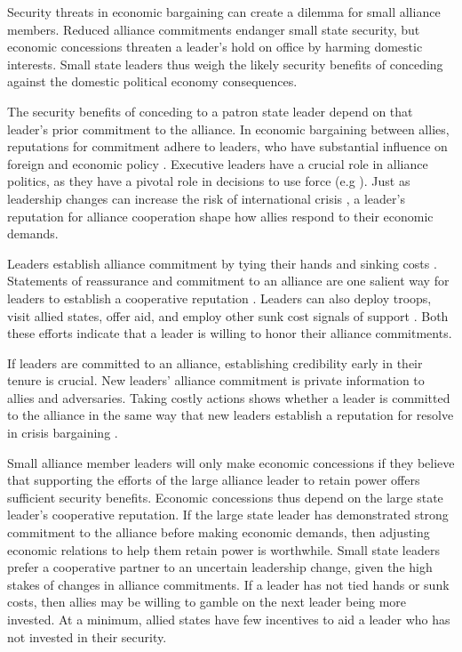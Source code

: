 \documentclass[12pt]{article}
\begin{document}
Security threats in economic bargaining can create a dilemma for small alliance members. 
Reduced alliance commitments endanger small state security, but economic concessions threaten a leader's hold on office by harming domestic interests. 
Small state leaders thus weigh the likely security benefits of conceding against the domestic political economy consequences.


The security benefits of conceding to a patron state leader depend on that leader's prior commitment to the alliance. 
In economic bargaining between allies, reputations for commitment adhere to leaders, who have substantial influence on foreign and economic policy \citep{Renshonetal2018}.
Executive leaders have a crucial role in alliance politics, as they have a pivotal role in decisions to use force (e.g \citep{Colgan2013, ColganWeeks2015}).
Just as leadership changes can increase the risk of international crisis \citep{Wolford2007}, a leader's reputation for alliance cooperation shape how allies respond to their economic demands. 


Leaders establish alliance commitment by tying their hands and sinking costs \citep{Fearon1997}. 
Statements of reassurance and commitment to an alliance are one salient way for leaders to establish a cooperative reputation \citep{Blankenship2020}.
Leaders can also deploy troops, visit allied states, offer aid, and employ other sunk cost signals of support \citep{McManusNieman2019}.
Both these efforts indicate that a leader is willing to honor their alliance commitments. 


If leaders are committed to an alliance, establishing credibility early in their tenure is crucial. 
New leaders' alliance commitment is private information to allies and adversaries. 
Taking costly actions shows whether a leader is committed to the alliance in the same way that new leaders establish a reputation for resolve in crisis bargaining \citep{Wolford2007}. 


Small alliance member leaders will only make economic concessions if they believe that supporting the efforts of the large alliance leader to retain power offers sufficient security benefits. 
Economic concessions thus depend on the large state leader's cooperative reputation. 
If the large state leader has demonstrated strong commitment to the alliance before making economic demands, then adjusting economic relations to help them retain power is worthwhile.
Small state leaders prefer a cooperative partner to an uncertain leadership change, given the high stakes of changes in alliance commitments.
If a leader has not tied hands or sunk costs, then allies may be willing to gamble on the next leader being more invested. 
At a minimum, allied states have few incentives to aid a leader who has not invested in their security. 
\end{document}
